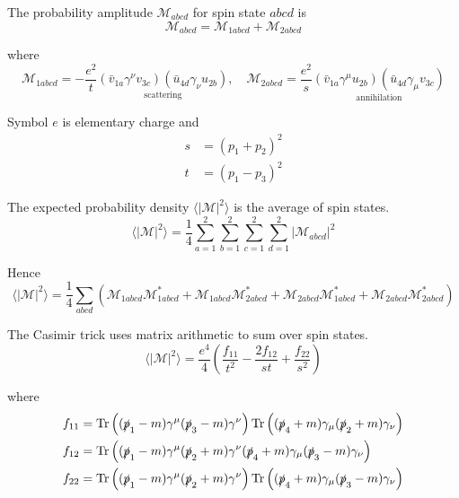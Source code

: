 The probability amplitude $\mathcal M_{abcd}$ for spin state $abcd$ is
\begin{equation*}
\mathcal M_{abcd}=\mathcal M_{1abcd}+\mathcal M_{2abcd}
\end{equation*}

where
\begin{equation*}
\mathcal M_{1abcd}=-\frac{e^2}{t}
\underset{\text{scattering}}
{(\bar v_{1a}\gamma^\nu v_{3c})(\bar u_{4d}\gamma_\nu u_{2b})},
\quad
\mathcal M_{2abcd}=\frac{e^2}{s}
\underset{\text{annihilation}}
{(\bar v_{1a}\gamma^\mu u_{2b})(\bar u_{4d}\gamma_\mu v_{3c})}
\end{equation*}

Symbol $e$ is elementary charge and
\begin{align*}
s&=(p_1+p_2)^2
\\
t&=(p_1-p_3)^2
\end{align*}

The expected probability density $\langle|\mathcal M|^2\rangle$
is the average of spin states.
\begin{equation*}
\langle|\mathcal M|^2\rangle=\frac{1}{4}
\sum_{a=1}^2\sum_{b=1}^2\sum_{c=1}^2\sum_{d=1}^2
|\mathcal M_{abcd}|^2
\end{equation*}

Hence
\begin{equation*}
\langle|\mathcal{M}|^2\rangle=\frac{1}{4}
\sum_{abcd}
\left(
\mathcal M_{1abcd}\mathcal M_{1abcd}^*
+\mathcal M_{1abcd}\mathcal M_{2abcd}^*
+\mathcal M_{2abcd}\mathcal M_{1abcd}^*
+\mathcal M_{2abcd}\mathcal M_{2abcd}^*
\right)
\end{equation*}

The Casimir trick uses matrix arithmetic to sum over spin states.
\begin{equation*}
\langle|\mathcal{M}|^2\rangle
=\frac{e^4}{4}
\left(
\frac{f_{11}}{t^2}-\frac{2f_{12}}{st}+\frac{f_{22}}{s^2}
\right)
\end{equation*}

where
\begin{align*}
f_{11}&=\operatorname{Tr}\left(
(\slashed p_1-m)\gamma^\mu(\slashed p_3-m)\gamma^\nu
\right)
\operatorname{Tr}\left(
(\slashed p_4+m)\gamma_\mu(\slashed p_2+m)\gamma_\nu
\right)
\\
f_{12}&=\operatorname{Tr}\left(
(\slashed p_1-m)\gamma^\mu(\slashed p_2+m)\gamma^\nu
(\slashed p_4+m)\gamma_\mu(\slashed p_3-m)\gamma_\nu
\right)
\\
f_{22}&=\operatorname{Tr}\left(
(\slashed p_1-m)\gamma^\mu(\slashed p_2+m)\gamma^\nu
\right)
\operatorname{Tr}\left(
(\slashed p_4+m)\gamma_\mu(\slashed p_3-m)\gamma_\nu
\right)
\end{align*}

